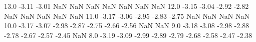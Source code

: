 13.0  -3.11    -3.01    NaN NaN NaN NaN NaN NaN NaN
12.0  -3.15    -3.04    -2.92    -2.82    NaN NaN NaN NaN NaN
11.0  -3.17    -3.06    -2.95    -2.83    -2.75    NaN NaN NaN NaN
10.0  -3.17    -3.07    -2.98    -2.87    -2.75    -2.66    -2.56    NaN NaN
9.0  -3.18    -3.08    -2.98    -2.88    -2.78    -2.67    -2.57    -2.45    NaN
8.0  -3.19    -3.09    -2.99    -2.89    -2.79    -2.68    -2.58    -2.47    -2.38  
